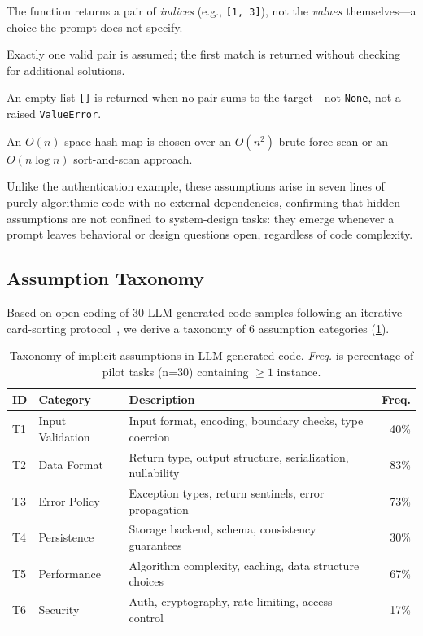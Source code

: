 \documentclass[sigconf,review,anonymous]{acmart}
\newcommand{\NumAssumptionTypes}{6\xspace}
\newcommand{\Bone}{$\mathsf{B_1}$\xspace}
\newcommand{\Btwo}{$\mathsf{B_2}$\xspace}
\newcommand{\Bthree}{$\mathsf{B_3}$\xspace}
\newcommand{\Bfour}{$\mathsf{B_4}$\xspace}
\newcommand{\code}[1]{\texttt{#1}}
\begin{document}
\begin{description}[leftmargin=2em, labelindent=0pt, noitemsep]
  \item[\Bone \textbf{Return type (T2):}] The function returns a pair of
       \emph{indices} (e.g., \code{[1,~3]}), not the \emph{values}
       themselves---a choice the prompt does not specify.
  \item[\Btwo \textbf{Uniqueness (T3):}] Exactly one valid pair is assumed;
       the first match is returned without checking for additional solutions.
  \item[\Bthree \textbf{No-solution policy (T3):}] An empty list \code{[]}
       is returned when no pair sums to the target---not \code{None}, not a
       raised \code{ValueError}.
  \item[\Bfour \textbf{Space--time trade-off (T5):}] An $O(n)$-space hash map
       is chosen over an $O(n^2)$ brute-force scan or an $O(n\log n)$
       sort-and-scan approach.
\end{description}

Unlike the authentication example, these assumptions arise in seven lines of
purely algorithmic code with no external dependencies, confirming that hidden
assumptions are not confined to system-design tasks: they emerge whenever a
prompt leaves behavioral or design questions open, regardless of code complexity.

\subsection{Assumption Taxonomy}
\label{sec:taxonomy}

Based on open coding of 30 LLM-generated code samples following an
iterative card-sorting protocol~\cite{spencer2009card}, we derive a taxonomy of
\NumAssumptionTypes assumption categories (\cref{tab:taxonomy}).

\begin{table}[t]
\caption{Taxonomy of implicit assumptions in LLM-generated code.
         \emph{Freq.} is percentage of pilot tasks (n=30) containing $\geq 1$ instance.}
\label{tab:taxonomy}
\small
\begin{tabular}{@{}llp{3.5cm}r@{}}
\toprule
\textbf{ID} & \textbf{Category} & \textbf{Description} & \textbf{Freq.} \\
\midrule
T1 & Input Validation & Input format, encoding, boundary checks, type coercion & 40\% \\
T2 & Data Format      & Return type, output structure, serialization, nullability & 83\% \\
T3 & Error Policy     & Exception types, return sentinels, error propagation     & 73\% \\
T4 & Persistence      & Storage backend, schema, consistency guarantees          & 30\% \\
T5 & Performance      & Algorithm complexity, caching, data structure choices    & 67\% \\
T6 & Security         & Auth, cryptography, rate limiting, access control        & 17\% \\
\bottomrule
\end{tabular}
\end{table}
\end{document}
